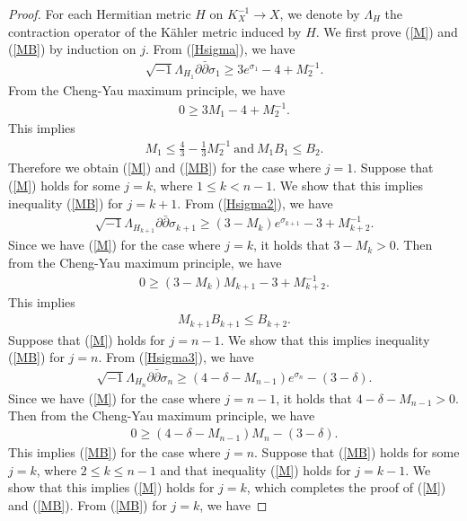 \documentclass[12pt]{article}
\theoremstyle{definition}
\def\inum{{\sqrt{-1}}}
\begin{document}
\begin{proof}
For each Hermitian metric $H$ on $K_X^{-1}\rightarrow X$, we denote by $\Lambda_{H}$ the contraction operator of the K\"ahler metric induced by $H$. We first prove (\ref{M}) and (\ref{MB}) by induction on $j$. From (\ref{Hsigma}), we have 
\begin{align*}
\inum\Lambda_{H_1}\partial \bar{\partial} \sigma_1\geq 3e^{\sigma_1}-4+M_2^{-1}.
\end{align*}
From the Cheng-Yau maximum principle, we have
\begin{align*}
0\geq 3M_1-4+M_2^{-1}.
\end{align*}
This implies
\begin{align*}
M_1\leq \frac{4}{3}-\frac{1}{3}M_2^{-1} \ \text{and} \ M_1B_1\leq B_2.
\end{align*}
Therefore we obtain (\ref{M}) and (\ref{MB}) for the case where $j=1$.
Suppose that (\ref{M}) holds for some $j=k$, where $1\leq k<n-1$. We show that this implies inequality (\ref{MB}) for $j=k+1$. From (\ref{Hsigma2}), we have 
\begin{align*}
\inum \Lambda_{H_{k+1}}\partial\bar{\partial}\sigma_{k+1} \geq (3-M_k)e^{\sigma_{k+1}}-3+M_{k+2}^{-1}.
\end{align*}
Since we have (\ref{M}) for the case where $j=k$, it holds that $3-M_k>0$. Then from the Cheng-Yau maximum principle, we have
\begin{align*}
0\geq (3-M_k)M_{k+1}-3+M_{k+2}^{-1}.
\end{align*}
This implies 
\begin{align*}
M_{k+1}B_{k+1} \leq B_{k+2}.
\end{align*}
Suppose that (\ref{M}) holds for $j=n-1$. We show that this implies inequality (\ref{MB}) for $j=n$. From (\ref{Hsigma3}), we have
\begin{align*}
\inum \Lambda_{H_n}\partial\bar{\partial} \sigma_n\geq (4-\delta-M_{n-1})e^{\sigma_n}-(3-\delta). 
\end{align*}
Since we have (\ref{M}) for the case where $j=n-1$, it holds that $4-\delta-M_{n-1}>0$. Then from the Cheng-Yau maximum principle, we have 
\begin{align*}
0\geq (4-\delta-M_{n-1})M_n-(3-\delta).
\end{align*}
This implies (\ref{MB}) for the case where $j=n$. Suppose that (\ref{MB}) holds for some $j=k$, where $2\leq k\leq n-1$ and that inequality (\ref{M}) holds for $j=k-1$. We show that this implies (\ref{M}) holds for $j=k$, which completes the proof of (\ref{M}) and (\ref{MB}). From (\ref{MB}) for $j=k$, we have

\end{proof}
\end{document}
